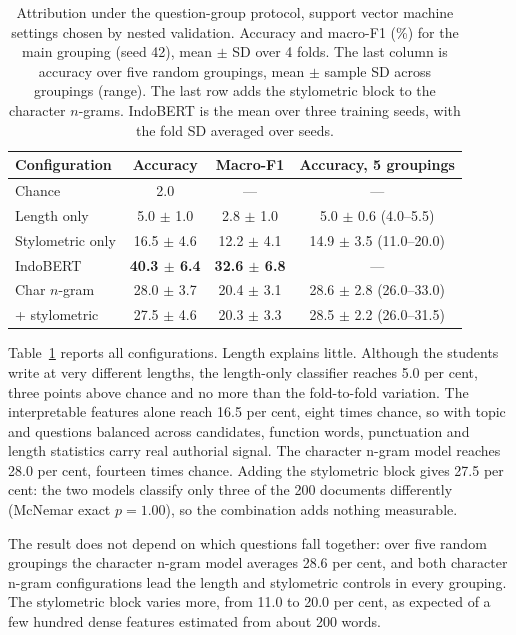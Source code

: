 \documentclass[conference]{IEEEtran}
\begin{document}
\begin{table}[!t]
\caption{Attribution under the question-group protocol, support vector machine settings chosen by nested validation. Accuracy and macro-F1 (\%) for the main grouping (seed 42), mean $\pm$ SD over 4 folds. The last column is accuracy over five random groupings, mean $\pm$ sample SD across groupings (range). The last row adds the stylometric block to the character $n$-grams. IndoBERT is the mean over three training seeds, with the fold SD averaged over seeds.}
\label{tab:main}
\centering
\footnotesize
\setlength{\tabcolsep}{3pt}
\begin{tabular}{@{}lccc@{}}
\hline
Configuration & Accuracy & Macro-F1 & Accuracy, 5 groupings \\
\hline
Chance             & 2.0 & --- & --- \\
Length only        & 5.0 $\pm$ 1.0 & 2.8 $\pm$ 1.0 & 5.0 $\pm$ 0.6 (4.0--5.5) \\
Stylometric only   & 16.5 $\pm$ 4.6 & 12.2 $\pm$ 4.1 & 14.9 $\pm$ 3.5 (11.0--20.0) \\
IndoBERT           & \textbf{40.3 $\pm$ 6.4} & \textbf{32.6 $\pm$ 6.8} & --- \\
Char $n$-gram      & 28.0 $\pm$ 3.7 & 20.4 $\pm$ 3.1 & 28.6 $\pm$ 2.8 (26.0--33.0) \\
\quad + stylometric & 27.5 $\pm$ 4.6 & 20.3 $\pm$ 3.3 & 28.5 $\pm$ 2.2 (26.0--31.5) \\
\hline
\end{tabular}
\end{table}

Table~\ref{tab:main} reports all configurations. Length explains little. Although the students write at very different lengths, the length-only classifier reaches 5.0 per cent, three points above chance and no more than the fold-to-fold variation. The interpretable features alone reach 16.5 per cent, eight times chance, so with topic and questions balanced across candidates, function words, punctuation and length statistics carry real authorial signal. The character n-gram model reaches 28.0 per cent, fourteen times chance. Adding the stylometric block gives 27.5 per cent: the two models classify only three of the 200 documents differently (McNemar exact $p = 1.00$), so the combination adds nothing measurable.

The result does not depend on which questions fall together: over five random groupings the character n-gram model averages 28.6 per cent, and both character n-gram configurations lead the length and stylometric controls in every grouping. The stylometric block varies more, from 11.0 to 20.0 per cent, as expected of a few hundred dense features estimated from about 200 words.
\end{document}
